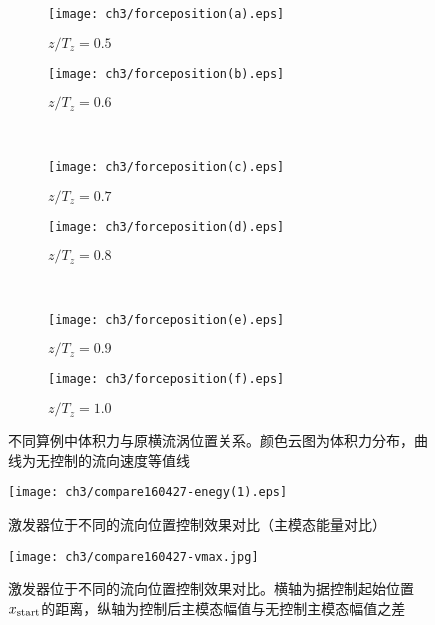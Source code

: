 \begin{figure}[H]
    \centering
    \begin{subfigure}{0.45\textwidth}           %
        \texttt{[image: ch3/forceposition(a).eps]}
        \caption{$z/T_z = 0.5$}\label{f:a1}
    \end{subfigure}
    \begin{subfigure}{0.45\textwidth}
        \texttt{[image: ch3/forceposition(b).eps]}
        \caption{$z/T_z = 0.6$}\label{f:b1}
    \end{subfigure}
    \\ \bigskip
    \begin{subfigure}{0.45\textwidth}         %
        \texttt{[image: ch3/forceposition(c).eps]}
        \caption{$z/T_z = 0.7$}\label{f:c1}
    \end{subfigure}
    \begin{subfigure}{0.45\textwidth}          %
        \texttt{[image: ch3/forceposition(d).eps]}
        \caption{$z/T_z = 0.8$}\label{f:d1}
    \end{subfigure}
    \\ \bigskip
    \begin{subfigure}{0.45\textwidth}          %
        \texttt{[image: ch3/forceposition(e).eps]}
        \caption{$z/T_z = 0.9$}\label{f:e1}
    \end{subfigure}
    \begin{subfigure}{0.45\textwidth}          %
        \texttt{[image: ch3/forceposition(f).eps]}
        \caption{$z/T_z = 1.0$}\label{f:f1}
    \end{subfigure}
    \caption{不同算例中体积力与原横流涡位置关系。颜色云图为体积力分布，曲线为无控制的流向速度等值线}
    \label{f:spanwiselocations} %
\end{figure}
\begin{figure}[htb]
  \centering
  \texttt{[image: ch3/compare160427-enegy(1).eps]}\\
  \caption{激发器位于不同的流向位置控制效果对比（主模态能量对比）}\label{f:streamforce}
\end{figure}
\begin{figure}
  \centering
  \texttt{[image: ch3/compare160427-vmax.jpg]}\\
  \caption{激发器位于不同的流向位置控制效果对比。横轴为据控制起始位置$x_{\rm start}$的距离，纵轴为控制后主模态幅值与无控制主模态幅值之差}\label{f:streamforce2}
\end{figure}

